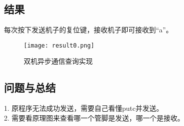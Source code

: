 \subsection{结果}
每次按下发送机子的复位键，接收机子即可接收到“a”。
\begin{figure}[htbp]
    \centering
    \texttt{[image: result0.png]}
    \caption{双机异步通信查询实现}
  \end{figure}
\subsection{问题与总结}
1. 原程序无法成功发送，需要自己看懂putc并发送。\\
2. 需要看原理图来查看哪一个管脚是发送，哪一个是接收。